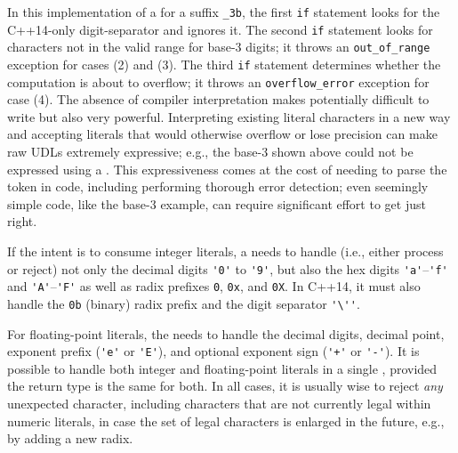 \noindent In this implementation of a  for a suffix
\lstinline!_3b!, the first \lstinline!if! statement looks for the C++14-only digit-separator and ignores it. The second \lstinline!if! statement
looks for characters not in the valid range for base-3 digits; it throws
an \lstinline!out_of_range! exception for cases (2) and (3). The third
\lstinline!if! statement determines whether the computation is about to
overflow; it throws an \lstinline!overflow_error! exception for case (4).
The absence of compiler interpretation makes 
potentially difficult to write but also very powerful. Interpreting
existing literal characters in a new way and accepting literals that
would otherwise overflow or lose precision can make raw UDLs extremely
expressive; e.g., the base-3  shown above could
not be expressed using a . This
expressiveness comes at the cost of needing to parse the token in code,
including performing thorough error detection; even seemingly simple
code, like the base-3 example, can require significant effort to get
just right.

If the intent is to consume integer literals, a  needs to handle (i.e., either process or reject) not only the
decimal digits \lstinline!'0'! to \lstinline!'9'!, but also the hex digits
\lstinline!'a'!--\lstinline!'f'! and \lstinline!'A'!--\lstinline!'F'! as well as
radix prefixes \lstinline!0!, \lstinline!0x!, and \lstinline!0X!. In C++14, it
must also handle the \lstinline!0b! (binary) radix prefix and the digit
separator \lstinline!'\''!.  

For floating-point literals, the  needs to
handle the decimal digits, decimal point, exponent prefix (\lstinline!'e'!
or \lstinline!'E'!), and optional exponent sign (\lstinline!'+'! or
\lstinline!'-'!). It is possible to handle both integer and floating-point
literals in a single , provided the return type
is the same for both. In all cases, it is usually wise to reject
\emph{any} unexpected character, including characters that are not
currently legal within numeric literals, in case the set of legal
characters is enlarged in the future, e.g., by adding a new radix.


